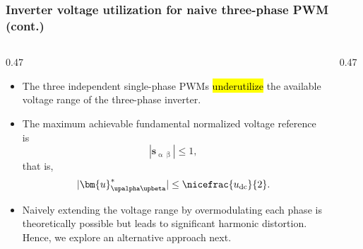 \begin{frame}[b]
    \frametitle{Inverter voltage utilization for naive three-phase PWM (cont.)}
    \begin{columns}[onlytextwidth]
        \begin{column}{0.47\textwidth}
            \begin{itemize}
                \item The three independent single-phase PWMs \hl{underutilize} the available voltage range of the three-phase inverter.
                \item<2-> The maximum achievable fundamental normalized voltage reference is $$|\bm{s}_{\upalpha\upbeta}| \leq 1,$$ that is, $$|\bm{u}^*_{\upalpha\upbeta}| \leq \nicefrac{u_\mathrm{dc}}{2}.$$
                \item<3-> Naively extending the voltage range by overmodulating each phase is theoretically possible but leads to significant harmonic distortion. Hence, we explore an alternative approach next.
            \end{itemize}
        \end{column}
        \begin{column}{0.47\textwidth}
            \centering
            \vspace{-0.25cm}
            \begin{figure}
\end{figure}
\end{column}
\end{columns}
\end{frame}
